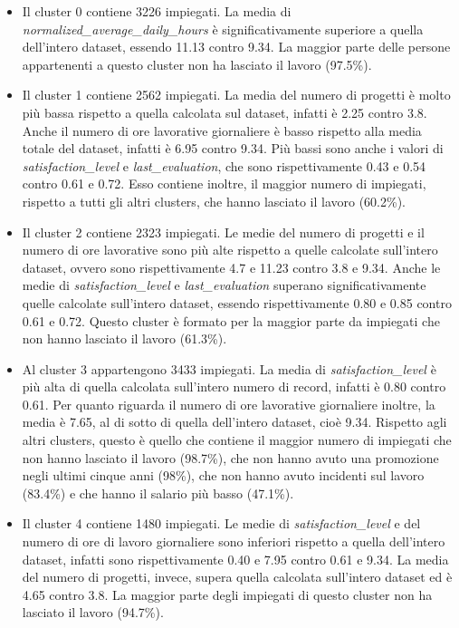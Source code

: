 	\begin{itemize}
	\item Il cluster 0 contiene 3226 impiegati. La media di \textit{normalized\_average\_daily\_hours} è significativamente superiore a quella dell’intero dataset, essendo 11.13 contro 9.34. La maggior parte delle persone appartenenti a questo cluster non ha lasciato il lavoro (97.5\%).\vspace{-0.2cm}
	\item Il cluster 1 contiene 2562 impiegati. La media del numero di progetti è molto più bassa rispetto a quella calcolata sul dataset, infatti è 2.25 contro 3.8. Anche il numero di ore lavorative giornaliere è basso rispetto alla media totale del dataset, infatti è 6.95 contro 9.34. Più bassi sono anche i valori di \textit{satisfaction\_level} e \textit{last\_evaluation}, che sono rispettivamente 0.43 e 0.54 contro 0.61 e 0.72. Esso contiene inoltre, il maggior numero di impiegati, rispetto a tutti gli altri clusters, che hanno lasciato il lavoro (60.2\%).\vspace{-0.2cm}
	\item Il cluster 2 contiene 2323 impiegati. Le medie del numero di progetti e il numero di ore lavorative sono più alte rispetto a quelle calcolate sull’intero dataset, ovvero sono rispettivamente 4.7 e 11.23 contro 3.8 e 9.34. Anche le medie di \textit{satisfaction\_level} e \textit{last\_evaluation} superano significativamente quelle calcolate sull’intero dataset, essendo rispettivamente 0.80 e 0.85 contro 0.61 e 0.72. Questo cluster è formato per la maggior parte da impiegati che non hanno lasciato il lavoro (61.3\%).\vspace{-0.2cm}
	\item Al cluster 3 appartengono 3433 impiegati. La media di \textit{satisfaction\_level} è più alta di quella calcolata sull’intero numero di record, infatti è 0.80 contro 0.61. Per quanto riguarda il numero di ore lavorative giornaliere inoltre, la media è 7.65, al di sotto di quella dell’intero dataset, cioè 9.34. Rispetto agli altri clusters, questo è quello che contiene il maggior numero di impiegati che non hanno lasciato il lavoro (98.7\%), che non hanno avuto una promozione negli ultimi cinque anni (98\%), che non hanno avuto incidenti sul lavoro (83.4\%) e che hanno il salario più basso (47.1\%).\vspace{-0.2cm}
	\item Il cluster 4 contiene 1480 impiegati. Le medie di \textit{satisfaction\_level} e del numero di ore di lavoro giornaliere sono inferiori rispetto a quella dell’intero dataset, infatti sono rispettivamente 0.40 e 7.95 contro 0.61 e 9.34. La media del numero di progetti, invece, supera quella calcolata sull’intero dataset ed è 4.65 contro 3.8.  La maggior parte degli impiegati di questo cluster non ha lasciato il lavoro (94.7\%).\vspace{-0.2cm}

\end{itemize}
